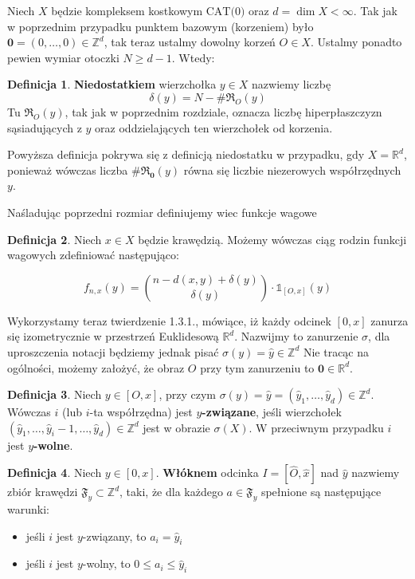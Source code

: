 \documentclass[licencjacka]{pracamgr}
\theoremstyle{definition}
\newtheorem{definition}{Definicja}[section]
\theoremstyle{definition}
\theoremstyle{definition}
\theoremstyle{definition}
\theoremstyle{definition}
\theoremstyle{plain}
\theoremstyle{plain}
\begin{document}
Niech $ X $ będzie kompleksem kostkowym $ \text{CAT(0)} $ oraz $ d = \dim X < \infty $. 
Tak jak w poprzednim przypadku punktem bazowym (korzeniem) było $ \textbf{0} = (0, \dots, 0) 
\in \mathbb{Z}^d $, tak teraz ustalmy dowolny korzeń $ O \in X $. Ustalmy ponadto pewien 
wymiar otoczki $ N \geq d - 1 $. Wtedy:
\begin{definition}
	\textbf{Niedostatkiem} wierzchołka $ y \in X $ nazwiemy liczbę
	$$ \delta(y) = N - \# \mathfrak{R}_O(y) $$
	Tu $ \mathfrak{R}_O(y) $, tak jak w poprzednim rozdziale, oznacza liczbę 
	hiperpłaszczyzn sąsiadujących z $ y $ oraz oddzielających ten wierzchołek od korzenia.
\end{definition}

Powyższa definicja pokrywa się z definicją niedostatku w przypadku, gdy $ X = 
\mathbb{R}^d $, ponieważ wówczas liczba $ \# \mathfrak{R}_{\textbf{0}} (y)$ równa się 
liczbie niezerowych współrzędnych $ y$.

Naśladując poprzedni rozmiar definiujemy wiec funkcje wagowe
\begin{definition}
	Niech $ x \in X $ będzie krawędzią. Możemy wówczas ciąg rodzin funkcji wagowych 
	zdefiniować następująco:

	$$ f_{n,x}(y) = {n - d(x,y) + \delta(y) \choose \delta(y)} \cdot 
	\mathbb{1}_{[O, x]}(y) $$
\end{definition}

Wykorzystamy teraz twierdzenie 1.3.1., mówiące, iż każdy odcinek $ [0,x] $ 
zanurza się izometrycznie w przestrzeń Euklidesową $ \mathbb{R}^d $. Nazwijmy to 
zanurzenie $  \sigma $, dla uproszczenia notacji będziemy jednak pisać $ \sigma(y) = 
\hat y \in \mathbb{Z}^d $
Nie tracąc na ogólności, możemy 
założyć, że obraz $ O $ przy tym zanurzeniu to $ \textbf{0} \in \mathbb{R}^d $. 

\begin{definition}
	Niech $ y \in [O, x]$, przy czym  $\sigma(y) = \hat y = (\hat y_1, \dots, \hat y_d) \in 
	\mathbb{Z}^d$. 
	Wówczas $ i $ (lub $ i $-ta współrzędna) jest 
	\textbf{$ y $-związane}, 
	jeśli wierzchołek $ (\hat y_1, \dots, \hat y_i - 1, \dots, \hat y_d) \in \mathbb{Z}^d $ 
	jest w obrazie $ \sigma(X) $. W przeciwnym przypadku $ i $ jest \textbf{$ y $-wolne}.
\end{definition}

\begin{definition}
	Niech $ y \in [0,x] $. \textbf{Włóknem} odcinka $ I = [\hat O, \hat x] $ nad $ \hat y $ 
	nazwiemy zbiór krawędzi $ \mathfrak{F}_y \subset \mathbb{Z}^d $, taki, że dla 
	każdego $ a \in \mathfrak{F}_y $ spełnione są 
	następujące warunki:
	\begin{itemize}
		\item jeśli $ i $ jest $ y $-związany, to $ a_i = \hat y_i $
		\item jeśli $ i $ jest $ y $-wolny, to $ 0 \leq a_i \leq \hat y_i $
	\end{itemize}
\end{definition}
\end{document}
